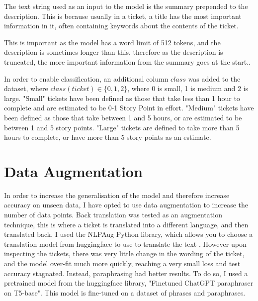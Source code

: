 \documentclass{UoYCSproject}
\begin{document}
    The text string used as an input to the model is the summary prepended to the description.
    This is because usually in a ticket, a title has the most important information in it, often containing keywords about the contents of the ticket. \par
    This is important as the model has a word limit of 512 tokens, and the description is sometimes longer than this, therefore as the description is truncated, the more important information from the summary goes at the start..

    In order to enable classification, an additional column $class$ was added to the dataset, where $class(ticket) \in \{0,1,2\}$, where 0 is small, 1 is medium and 2 is large.
    "Small" tickets have been defined as those that take less than 1 hour to complete and are estimated to be 0-1 Story Point in effort.
    "Medium" tickets have been defined as those that take between 1 and 5 hours, or are estimated to be between 1 and 5 story points.
    "Large" tickets are defined to take more than 5 hours to complete, or have more than 5 story points as an estimate.


%


    \section{Data Augmentation}\label{sec:data-augmentation}
    In order to increase the generalisation of the model and therefore increase accuracy on unseen data, I have opted to use data augmentation to increase the number of data points.
    Back translation was tested as an augmentation technique, this is where a ticket is translated into a different language, and then translated back.
    I used the NLPAug Python library, which allows you to choose a translation model from huggingface to use to translate the text \cite{ma2019nlpaug}.
    However upon inspecting the tickets, there was very little change in the wording of the ticket, and the model over-fit much more quickly, reaching a very small loss and test accuracy stagnated.
    Instead, paraphrasing had better results.
    To do so, I used a pretrained model from the huggingface library, "Finetuned ChatGPT paraphraser on T5-base". \cite{chatgpt_paraphraser}
    This model is fine-tuned on a dataset of phrases and paraphrases.
\end{document}
